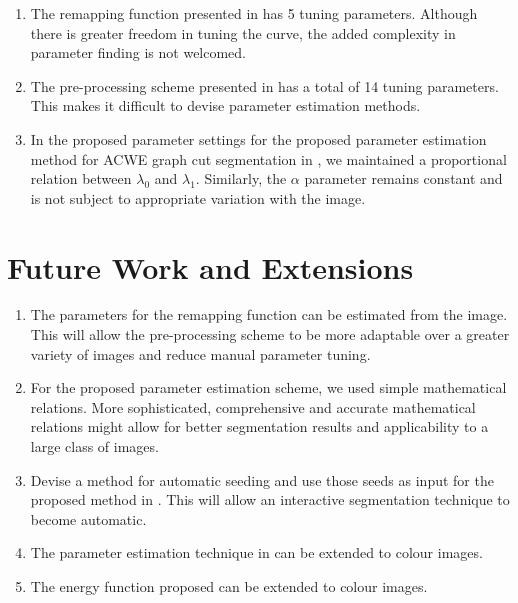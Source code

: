 \begin{enumerate}
	\item The remapping function presented in  has 5 tuning parameters. Although there is greater freedom in tuning the curve, the added complexity in parameter finding is not welcomed.
	
	\item The pre-processing scheme presented in  has a total of 14 tuning parameters. This makes it difficult to devise parameter estimation methods.
	
	\item In the proposed parameter settings for the proposed parameter estimation method for ACWE graph cut segmentation in , we maintained a proportional relation between $\lambda_0$ and $\lambda_1$. Similarly, the $\alpha$ parameter remains constant and is not subject to appropriate variation with the image. 
\end{enumerate}

\section{Future Work and Extensions}

\begin{enumerate}
	\item The parameters for the remapping function can be estimated from the image. This will allow the pre-processing scheme to be more adaptable over a greater variety of images and reduce manual parameter tuning.
	
	\item For the proposed parameter estimation scheme, we used simple mathematical relations. More sophisticated, comprehensive and accurate mathematical relations might allow for better segmentation results and applicability to a large class of images.
	
	\item Devise a method for automatic seeding and use those seeds as input for the proposed method in . This will allow an interactive segmentation technique to become automatic.
	
	\item The parameter estimation technique in  can be extended to colour images.
	
	\item The energy function proposed  can be extended to colour images.
\end{enumerate}

